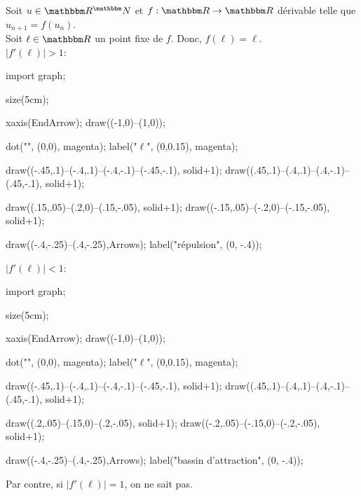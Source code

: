 \begin{rmk}
	Soit $u \in \R^\N$ et $f: \R \to \R$ dérivable telle que $u_{n+1} = f(u_n)$.\\
	Soit $\ell \in \R$ un point fixe de $f$. Donc, $f(\ell) = \ell$.\\

	$\left| f'(\ell) \right| > 1$:\\
	\begin{center}
		\begin{asy}
			import graph;

			size(5cm);

			xaxis(EndArrow);
			draw((-1,0)--(1,0));

			dot("{}", (0,0), magenta);
			label("$\ell$", (0,0.15), magenta);
			

			draw((-.45,.1)--(-.4,.1)--(-.4,-.1)--(-.45,-.1), solid+1);
			draw((.45,.1)--(.4,.1)--(.4,-.1)--(.45,-.1), solid+1);

			draw((.15,.05)--(.2,0)--(.15,-.05), solid+1);
			draw((-.15,.05)--(-.2,0)--(-.15,-.05), solid+1);

			draw((-.4,-.25)--(.4,-.25),Arrows);
			label("répulsion", (0, -.4));
		\end{asy}
	\end{center}
	$\left| f'(\ell) \right| < 1$:\\
	\begin{center}
		\begin{asy}
			import graph;

			size(5cm);

			xaxis(EndArrow);
			draw((-1,0)--(1,0));

			dot("{}", (0,0), magenta);
			label("$\ell$", (0,0.15), magenta);
			

			draw((-.45,.1)--(-.4,.1)--(-.4,-.1)--(-.45,-.1), solid+1);
			draw((.45,.1)--(.4,.1)--(.4,-.1)--(.45,-.1), solid+1);

			draw((.2,.05)--(.15,0)--(.2,-.05), solid+1);
			draw((-.2,.05)--(-.15,0)--(-.2,-.05), solid+1);

			draw((-.4,-.25)--(.4,-.25),Arrows);
			label("bassin d'attraction", (0, -.4));
		\end{asy}
	\end{center}

	Par contre, si $\left| f'(\ell) \right| =1$, on ne sait pas.
\end{rmk}

